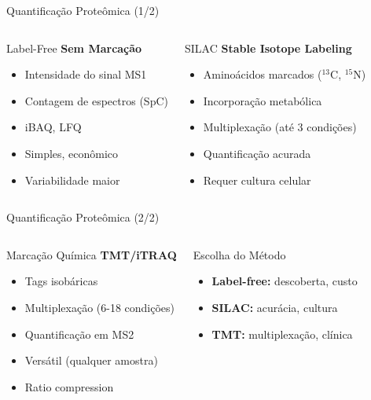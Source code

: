 \begin{frame}[shrink=10]{Quantificação Proteômica (1/2)}
\begin{columns}
\begin{block}{Label-Free}
\textbf{Sem Marcação}
\begin{itemize}
    \item Intensidade do sinal MS1
    \item Contagem de espectros (SpC)
    \item iBAQ, LFQ
    \item Simples, econômico
    \item Variabilidade maior
\end{itemize}
\end{block}

\begin{block}{SILAC}
\textbf{Stable Isotope Labeling}
\begin{itemize}
    \item Aminoácidos marcados ($^{13}$C, $^{15}$N)
    \item Incorporação metabólica
    \item Multiplexação (até 3 condições)
    \item Quantificação acurada
    \item Requer cultura celular
\end{itemize}
\end{block}
\end{columns}
\end{frame}

\begin{frame}[shrink=10]{Quantificação Proteômica (2/2)}
\begin{columns}
\begin{block}{Marcação Química}
\textbf{TMT/iTRAQ}
\begin{itemize}
    \item Tags isobáricas
    \item Multiplexação (6-18 condições)
    \item Quantificação em MS2
    \item Versátil (qualquer amostra)
    \item Ratio compression
\end{itemize}
\end{block}

\begin{exampleblock}{Escolha do Método}
\begin{itemize}
    \item \textbf{Label-free:} descoberta, custo
    \item \textbf{SILAC:} acurácia, cultura
    \item \textbf{TMT:} multiplexação, clínica
\end{itemize}
\end{exampleblock}
\end{columns}
\end{frame}

